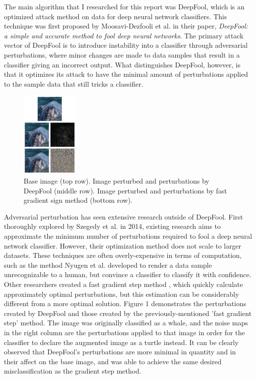 \documentclass[../article.tex]{subfiles}
\begin{document}
The main algorithm that I researched for this report was DeepFool, which is an optimized attack method on data for deep neural network classifiers. This technique was first proposed by Moosavi-Dezfooli et al. in their paper, \emph{DeepFool: a simple and accurate method to fool deep neural networks}. \cite{DBLP:conf/cvpr/Moosavi-Dezfooli16} The primary attack vector of DeepFool is to introduce instability into a classifier through adversarial perturbations, where minor changes are made to data samples that result in a classifier giving an incorrect output. What distinguishes DeepFool, however, is that it optimizes its attack to have the minimal amount of perturbations applied to the sample data that still tricks a classifier.

\begin{figure} %
	\centering
	\includegraphics[width=0.25\textwidth]{adv_pert_img.png}
	\caption{\label{fig:Figure 1}Base image (top row). Image perturbed and perturbations by DeepFool (middle row). Image perturbed and perturbations by fast gradient sign method (bottom row).}
\end{figure}

Adversarial perturbation has seen extensive research outside of DeepFool. First thoroughly explored by Szegedy et al. in 2014, existing research aims to approximate the minimum number of perturbations required to fool a deep neural network classifier. \cite{DBLP:journals/corr/SzegedyZSBEGF13} However, their optimization method does not scale to larger datasets. These techniques are often overly-expensive in terms of computation, such as the method Nyugen et al. developed to render a data sample unrecognizable to a human, but convince a classifier to classify it with confidence. \cite{DBLP:journals/corr/NguyenYC14} Other researchers created a fast gradient step method \cite{DBLP:journals/corr/GoodfellowSS14}, which quickly calculate approximately optimal perturbations, but this estimation can be considerably different from a more optimal solution. Figure 1 demonstrates the perturbations created by DeepFool and those created by the previously-mentioned 'fast gradient step' method. The image was originally classified as a whale, and the noise maps in the right column are the perturbations applied to that image in order for the classifier to declare the augmented image as a turtle instead. It can be clearly observed that DeepFool's perturbations are more minimal in quantity and in their affect on the base image, and was able to achieve the same desired misclassification as the gradient step method.
\end{document}
